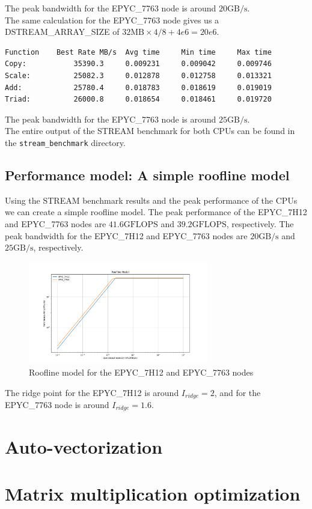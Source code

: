 \documentclass[unicode,11pt,a4paper,oneside,numbers=endperiod,openany]{scrartcl}
\begin{document}
The peak bandwidth for the EPYC\_7763 node is around $20\text{GB/s}$. \\

The same calculation for the EPYC\_7763 node gives us a DSTREAM\_ARRAY\_SIZE of $32\text{MB} \times 4 / 8 + 4e6 = 20e6$.

\begin{lstlisting}
Function    Best Rate MB/s  Avg time     Min time     Max time
Copy:           35390.3     0.009231     0.009042     0.009746
Scale:          25082.3     0.012878     0.012758     0.013321
Add:            25780.4     0.018783     0.018619     0.019019
Triad:          26000.8     0.018654     0.018461     0.019720
\end{lstlisting}

The peak bandwidth for the EPYC\_7763 node is around $25\text{GB/s}$. \\

The entire output of the STREAM benchmark for both CPUs can be found in the \texttt{stream\_benchmark} directory.

\subsection{Performance model: A simple roofline model}


Using the STREAM benchmark results and the peak performance of the CPUs we can create a simple roofline model. The peak performance of the EPYC\_7H12 and EPYC\_7763 nodes are $41.6\text{GFLOPS}$ and $39.2\text{GFLOPS}$, respectively. The peak bandwidth for the EPYC\_7H12 and EPYC\_7763 nodes are $20\text{GB/s}$ and $25\text{GB/s}$, respectively.

\begin{figure}[h]
    \centering
    \includegraphics[width=0.7\textwidth]{../01a/roofline_model/roofline.png}
    \caption{Roofline model for the EPYC\_7H12 and EPYC\_7763 nodes}
    \label{fig:roofline}
\end{figure}

The ridge point for the EPYC\_7H12 is around $I_{ridge}=2$, and for the EPYC\_7763 node is around $I_{ridge}=1.6$.

\section{Auto-vectorization}

\section{Matrix multiplication optimization}
\end{document}
